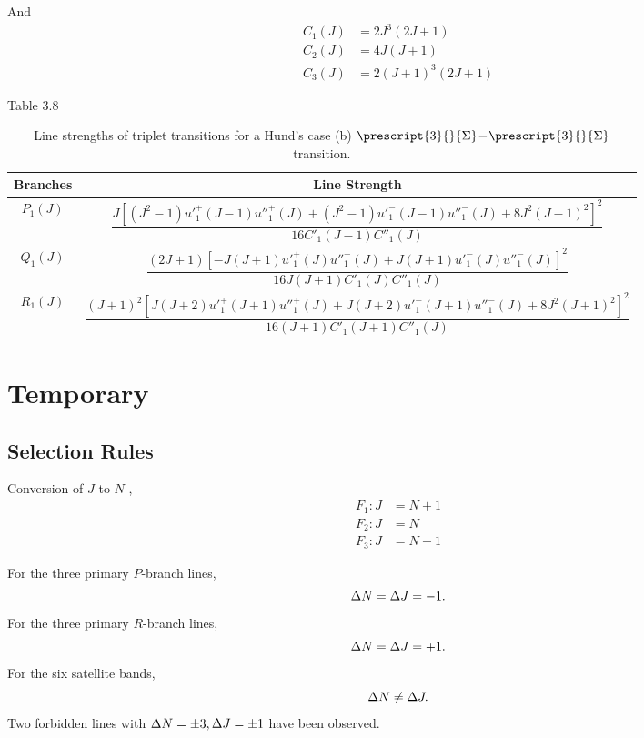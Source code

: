 \documentclass[11pt, twoside, fleqn]{report}
\newcommand{\dash}{\!-\!}
\newcommand{\state}[2]{\prescript{#1}{}{#2}}
\begin{document}
And
\begin{align*}
    C_1(J) & = 2J^3(2J + 1)       \\
    C_2(J) & = 4J(J + 1)            \\
    C_3(J) & = 2(J + 1)^3(2J + 1)
\end{align*}

Table 3.8
\begin{table}[H]
    \centering
    \caption{Line strengths of triplet transitions for a Hund's case (b) $\state{3}{\Sigma}\dash\state{3}{\Sigma}$ transition.}
    \begin{tabular}{cc}
        \toprule
        Branches   & Line Strength                                                                                                                                                      \\
        \midrule
        $P_1(J)$ & $\dfrac{J[(J^2 - 1)u'^{+}_1(J - 1)u''^{+}_1(J) + (J^2 - 1)u'^{-}_1(J - 1)u''^{-}_1(J) + 8J^2(J - 1)^2]^2}{16C'_1(J - 1)C''_1(J)}$            \\
        \addlinespace[0.5em]
        $Q_1(J)$ & $\dfrac{(2J + 1)[-J(J + 1)u'^{+}_1(J)u''^{+}_1(J) + J(J + 1)u'^{-}_1(J)u''^{-}_1(J)]^2}{16J(J + 1)C'_1(J)C''_1(J)}$                                  \\
        \addlinespace[0.5em]
        $R_1(J)$ & $\dfrac{(J + 1)^2[J(J + 2)u'^{+}_1(J + 1)u''^{+}_1(J) + J(J + 2)u'^{-}_1(J + 1)u''^{-}_1(J) + 8J^2(J + 1)^2]^2}{16(J + 1)C'_1(J + 1)C''_1(J)}$ \\
        \bottomrule
    \end{tabular}
\end{table}

\chapter{Temporary}

\section{Selection Rules}

Conversion of $J$ to $N$ \cite{grinsteadTemperatureMeasurementHighTemperature1995},
\begin{align*}
    F_1: J & = N + 1 \\
    F_2: J & = N     \\
    F_3: J & = N - 1
\end{align*}

For the three primary $P$-branch lines,
\begin{equation*}
    \adif{N} = \adif{J} = -1.
\end{equation*}
For the three primary $R$-branch lines,
\begin{equation*}
    \adif{N} = \adif{J} = +1.
\end{equation*}
For the six satellite bands,
\begin{equation*}
    \adif{N} \neq \adif{J}.
\end{equation*}
Two forbidden lines with $\adif{N} = \pm3, \adif{J} = \pm1$ have been observed.
\end{document}
